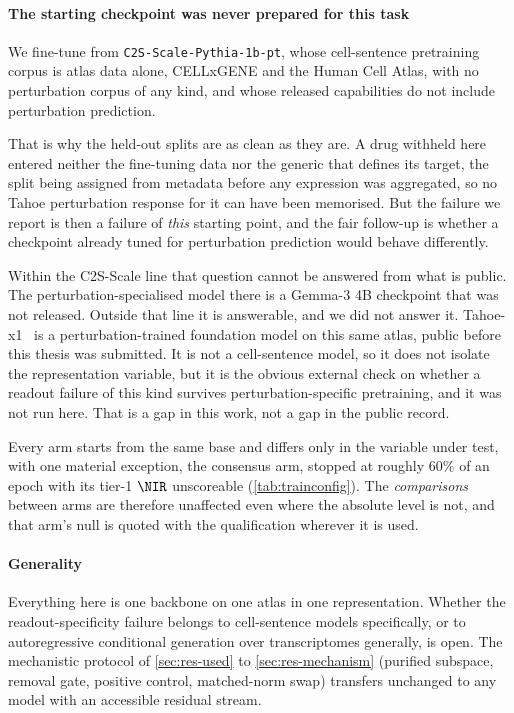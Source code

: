 \paragraph{The starting checkpoint was never prepared for this task} We
fine-tune from \texttt{C2S-Scale-Pythia-1b-pt}, whose cell-sentence pretraining
corpus is atlas data alone, CELLxGENE and the Human Cell Atlas, with no
perturbation corpus of any kind, and whose released capabilities do not include
perturbation prediction.

That is why the held-out splits are as clean as they are. A drug withheld here
entered neither the fine-tuning data nor the generic that defines its target,
the split being assigned from metadata before any expression was aggregated, so
no Tahoe perturbation response for it can have been memorised. But the failure
we report is then a failure of \emph{this} starting point, and the fair
follow-up is whether a checkpoint already tuned for perturbation prediction
would behave differently.

Within the C2S-Scale line that question cannot be answered from what is public.
The perturbation-specialised model there is a Gemma-3 4B checkpoint that was not
released. Outside that line it is answerable, and we did not answer it.
Tahoe-x1~\cite{tahoex1} is a perturbation-trained foundation model on this same
atlas, public before this thesis was submitted. It is not a cell-sentence model,
so it does not isolate the representation variable, but it is the obvious
external check on whether a readout failure of this kind survives
perturbation-specific pretraining, and it was not run here. That is a gap in
this work, not a gap in the public record.

Every arm starts from the same base and differs only in the variable under test,
with one material exception, the consensus arm, stopped at roughly $60\%$ of an
epoch with its tier-1 $\NIR$ unscoreable (\cref{tab:trainconfig}). The
\emph{comparisons} between arms are therefore unaffected even where the absolute
level is not, and that arm's null is quoted with the qualification wherever it
is used.

\paragraph{Generality} Everything here is one backbone on one atlas in one
representation. Whether the readout-specificity failure belongs to cell-sentence
models specifically, or to autoregressive conditional generation over
transcriptomes generally, is open. The mechanistic protocol of
\cref{sec:res-used} to \cref{sec:res-mechanism} (purified subspace, removal
gate, positive control, matched-norm swap) transfers unchanged to any model
with an accessible residual stream.
